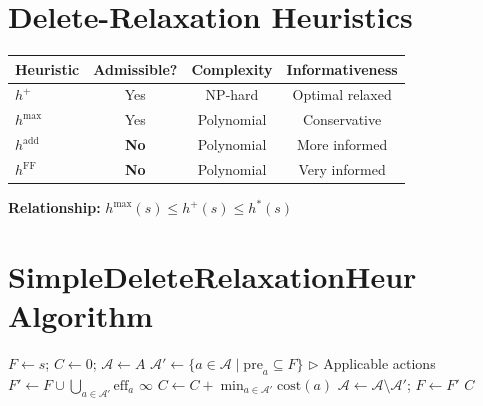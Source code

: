 \documentclass[11pt,a4paper]{article}
\begin{document}
\section{Delete-Relaxation Heuristics}

\begin{definitionbox}
\begin{center}
\begin{tabular}{@{}lccc@{}}
\toprule
\textbf{Heuristic} & \textbf{Admissible?} & \textbf{Complexity} & \textbf{Informativeness} \\
\midrule
$h^+$ & Yes & NP-hard & Optimal relaxed \\
$h^{\max}$ & Yes & Polynomial & Conservative \\
$h^{\text{add}}$ & \textbf{No} & Polynomial & More informed \\
$h^{\text{FF}}$ & \textbf{No} & Polynomial & Very informed \\
\bottomrule
\end{tabular}
\end{center}

\textbf{Relationship:} $h^{\max}(s) \leq h^+(s) \leq h^*(s)$
\end{definitionbox}

\section{SimpleDeleteRelaxationHeur Algorithm}

\begin{examplebox}
\begin{algorithmic}
\STATE $F \gets s$; $C \gets 0$; $\mathcal{A} \gets A$
    \STATE $\mathcal{A}' \gets \{a \in \mathcal{A} \mid \text{pre}_a \subseteq F\}$ \hfill $\triangleright$ Applicable actions
    \STATE $F' \gets F \cup \bigcup_{a \in \mathcal{A}'} \text{eff}_a$
        \RETURN $\infty$
    \ENDIF
    \STATE $C \gets C + \min_{a \in \mathcal{A}'} \text{cost}(a)$
    \STATE $\mathcal{A} \gets \mathcal{A} \setminus \mathcal{A}'$; $F \gets F'$
\ENDWHILE
\RETURN $C$
\end{algorithmic}
\end{examplebox}
\end{document}
